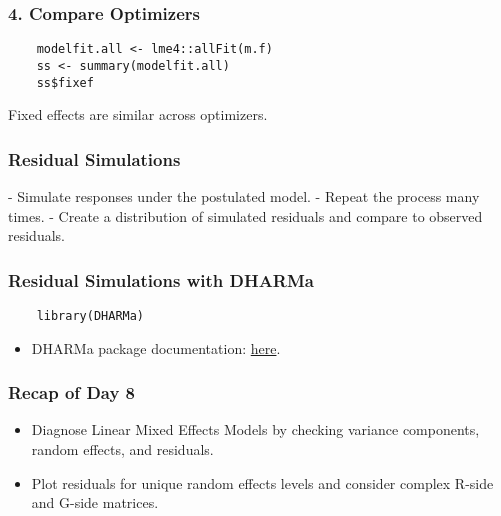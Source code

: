 \documentclass{beamer}
\begin{document}
\begin{frame}[fragile]
    \frametitle{4. Compare Optimizers}
    \lstset{style=Rstyle}
    \begin{lstlisting}
    modelfit.all <- lme4::allFit(m.f)
    ss <- summary(modelfit.all)
    ss$fixef
    \end{lstlisting}
    Fixed effects are similar across optimizers.
\end{frame}

\begin{frame}
    \frametitle{Residual Simulations}
    - Simulate responses under the postulated model.
    - Repeat the process many times.
    - Create a distribution of simulated residuals and compare to observed residuals.
\end{frame}

\begin{frame}[fragile]
    \frametitle{Residual Simulations with DHARMa}
    \lstset{style=Rstyle}
    \begin{lstlisting}
    library(DHARMa)
    \end{lstlisting}
    \begin{itemize}
        \item DHARMa package documentation: \href{https://cran.r-project.org/web/packages/DHARMa/vignettes/DHARMa.html}{here}.
    \end{itemize}
\end{frame}

\begin{frame}
    \frametitle{Recap of Day 8}
    \begin{itemize}
        \item Diagnose Linear Mixed Effects Models by checking variance components, random effects, and residuals.
        \item Plot residuals for unique random effects levels and consider complex R-side and G-side matrices.
    \end{itemize}
\end{frame}
\end{document}
